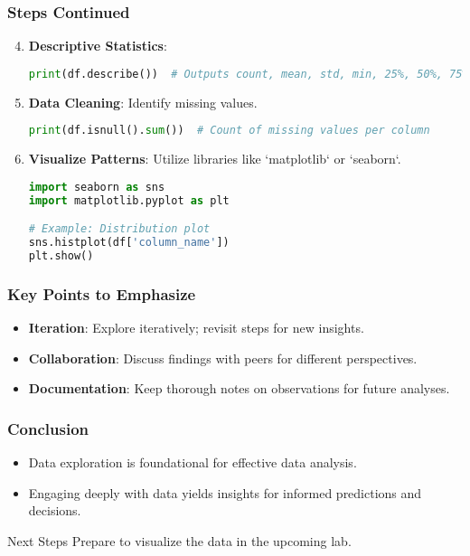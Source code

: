 \documentclass[aspectratio=169]{beamer}
\begin{document}
\begin{frame}[fragile]
    \frametitle{Steps Continued}
    \begin{enumerate}
        \setcounter{enumi}{3}
        \item \textbf{Descriptive Statistics}:
        \begin{lstlisting}[language=Python]
print(df.describe())  # Outputs count, mean, std, min, 25%, 50%, 75%, max
        \end{lstlisting}

        \item \textbf{Data Cleaning}:
        Identify missing values.
        \begin{lstlisting}[language=Python]
print(df.isnull().sum())  # Count of missing values per column
        \end{lstlisting}

        \item \textbf{Visualize Patterns}:
        Utilize libraries like `matplotlib` or `seaborn`.
        \begin{lstlisting}[language=Python]
import seaborn as sns
import matplotlib.pyplot as plt

# Example: Distribution plot
sns.histplot(df['column_name'])
plt.show()
        \end{lstlisting}
    \end{enumerate}
\end{frame}

\begin{frame}
    \frametitle{Key Points to Emphasize}
    \begin{itemize}
        \item \textbf{Iteration}: Explore iteratively; revisit steps for new insights.
        \item \textbf{Collaboration}: Discuss findings with peers for different perspectives.
        \item \textbf{Documentation}: Keep thorough notes on observations for future analyses.
    \end{itemize}
\end{frame}

\begin{frame}
    \frametitle{Conclusion}
    \begin{itemize}
        \item Data exploration is foundational for effective data analysis.
        \item Engaging deeply with data yields insights for informed predictions and decisions.
    \end{itemize}
    \begin{block}{Next Steps}
        Prepare to visualize the data in the upcoming lab.
    \end{block}
\end{frame}
\end{document}
